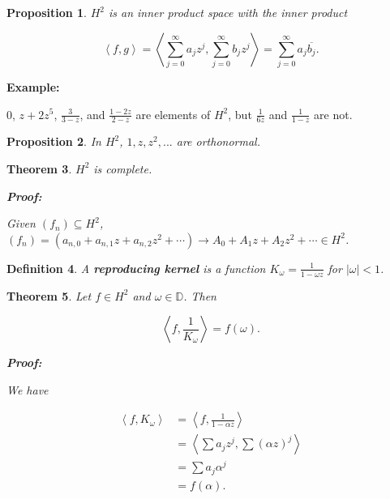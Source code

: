 \documentclass{article}
\theoremstyle{colontheorem}
\newtheorem{theorem}{Theorem}[section]
\newtheorem{proposition}[theorem]{Proposition}
\newtheorem{definition}[theorem]{Definition}
\newenvironment{Theorem}
{
	\begin{mdframed}[backgroundcolor=TheoremOrange!10]
	\begin{theorem}
}
{
	\end{theorem}
	\end{mdframed}
	
	\vspace{.15in}
}
\newenvironment{Proposition}
{
	\begin{mdframed}[backgroundcolor=TheoremOrange!10]
	\begin{proposition}
}
{
	\end{proposition}
	\end{mdframed}
	
	\vspace{.15in}
}
\newenvironment{Def}
{
	\begin{mdframed}[backgroundcolor=DefGreen!10]
	\begin{definition}
}
{
	\end{definition}
	\end{mdframed}
	
	\vspace{.15in}
}
\newenvironment{Proof}
{
	\begin{mdframed}[backgroundcolor=ProofPurple!10]
	\textbf{Proof:}%
}
{
	\end{mdframed}
	
	\vspace{.085in}
}
\newenvironment{Example}
{
	\begin{mdframed}
	\textbf{Example:}%
}
{
	\end{mdframed}
	
	\vspace{.15in}
}
\begin{document}
\begin{Proposition}
	
	$H^2$ is an inner product space with the inner product
	
	$$
		\left< f, g \right> = \left< \displaystyle\sum\limits_{j = 0}^\infty a_j z^j, \displaystyle\sum\limits_{j = 0}^\infty b_j z^j \right> = \displaystyle\sum\limits_{j = 0}^\infty a_j \overline{b_j}.
	$$
	
\end{Proposition}



\begin{Example}
	$0$, $z + 2z^5$, $\frac{3}{3 - z}$, and $\frac{1 - 2z}{2 - z}$ are elements of $H^2$, but $\frac{1}{6z}$ and $\frac{1}{1 - z}$ are not.
	
\end{Example}



\begin{Proposition}
	
	In $H^2$, $1, z, z^2, ...$ are orthonormal.
	
\end{Proposition}



\begin{Theorem}
	
	$H^2$ is complete.
	
	\begin{Proof}
		Given $(f_n) \subseteq H^2$, $(f_n) = (a_{n,0} + a_{n, 1} z + a_{n, 2} z^2 + \cdots) \to A_0 + A_1 z + A_2 z^2 + \cdots \in H^2$.
		
	\end{Proof}
	
\end{Theorem}



\begin{Def}
	
	A \textbf{reproducing kernel} is a function $K_\omega = \frac{1}{1 - \omega z}$ for $|\omega| < 1$.
	
\end{Def}



\begin{Theorem}
	
	Let $f \in H^2$ and $\omega \in \mathbb{D}$. Then
	
	$$
		\left< f, \frac{1}{K_\omega} \right> = f(\omega).
	$$
	
	\begin{Proof}
		We have
		
		\begin{align*}
			\left< f, K_\omega \right> &= \left< f, \frac{1}{1 - \alpha z} \right>\\
			&= \left< \sum a_j z^j, \displaystyle\sum (\alpha z)^j \right>\\
			&= \sum a_j \alpha^j\\
			&= f(\alpha).
		\end{align*}
		
	\end{Proof}
	
\end{Theorem}
\end{document}
